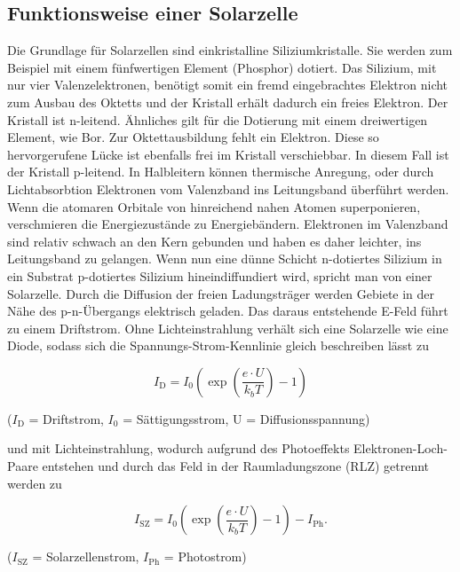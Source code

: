 \subsection{Funktionsweise einer Solarzelle}
Die Grundlage für Solarzellen sind einkristalline Siliziumkristalle. Sie werden zum Beispiel mit einem fünfwertigen Element (Phosphor)
dotiert. Das Silizium, mit nur vier Valenzelektronen, benötigt somit ein fremd eingebrachtes Elektron nicht zum Ausbau des Oktetts und der
Kristall erhält dadurch ein freies Elektron. Der Kristall ist n-leitend. Ähnliches gilt für die Dotierung mit einem dreiwertigen Element,
wie Bor. Zur Oktettausbildung fehlt ein Elektron. Diese so hervorgerufene Lücke ist ebenfalls frei im Kristall verschiebbar. In diesem Fall
ist der Kristall p-leitend. In Halbleitern können thermische Anregung, oder durch Lichtabsorbtion Elektronen vom Valenzband ins 
Leitungsband überführt werden. Wenn die atomaren Orbitale von hinreichend nahen Atomen superponieren, verschmieren die Energiezustände
zu Energiebändern. Elektronen im Valenzband sind relativ schwach an den Kern gebunden und haben es daher leichter, ins Leitungsband
zu gelangen. Wenn nun eine dünne Schicht n-dotiertes Silizium in ein Substrat p-dotiertes Silizium hineindiffundiert wird,
spricht man von einer Solarzelle. Durch die Diffusion der freien Ladungsträger werden Gebiete in der Nähe des p-n-Übergangs elektrisch geladen.
Das daraus entstehende E-Feld führt zu einem Driftstrom. Ohne Lichteinstrahlung verhält sich eine Solarzelle wie eine Diode, sodass
sich die Spannungs-Strom-Kennlinie gleich beschreiben lässt zu

\begin{formel}
\begin{equation}
 I_{\text{D}} = I_0 \left(\exp\left(\frac{e \cdot U}{k_b T}\right)-1\right)
\end{equation}
 \caption*{\small{($I_\text{D}$ = Driftstrom, $I_0$ = Sättigungsstrom, U = Diffusionsspannung)}}
\end{formel}

und mit Lichteinstrahlung, wodurch aufgrund des Photoeffekts Elektronen-Loch-Paare entstehen und durch das Feld in der 
Raumladungszone (RLZ) getrennt werden zu

\begin{formel}
\begin{equation}
 I_{\text{SZ}} = I_0 \left(\exp\left(\frac{e \cdot U}{k_b T}\right)-1\right) - I_{\text{Ph}}.
\end{equation}
 \caption*{\small{($I_{\text{SZ}}$ = Solarzellenstrom, $I_{\text{Ph}}$ = Photostrom)}}
\end{formel}

